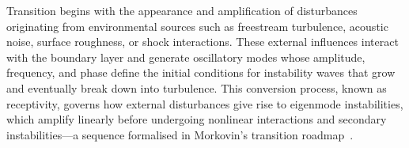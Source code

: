
Transition begins with the appearance and amplification of disturbances originating from environmental sources such as freestream turbulence, acoustic noise, surface roughness, or shock interactions. These external influences interact with the boundary layer and generate oscillatory modes whose amplitude, frequency, and phase define the initial conditions for instability waves that grow and eventually break down into turbulence. This conversion process, known as receptivity, governs how external disturbances give rise to eigenmode instabilities, which amplify linearly before undergoing nonlinear interactions and secondary instabilities—a sequence formalised in Morkovin’s transition roadmap~\citep{Morkovin1994}.

